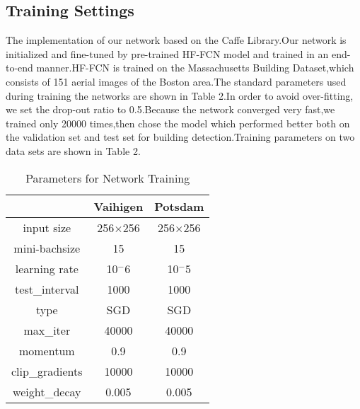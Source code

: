 \documentclass{article}
\begin{document}
\subsection{Training Settings}
The implementation of our network  based on the Caffe Library.Our network is initialized and fine-tuned by pre-trained HF-FCN model and trained in an end-to-end manner.HF-FCN is trained on the Massachusetts Building Dataset,which consists of 151 aerial images of the Boston area.The standard parameters used during training the networks are shown in Table 2.In order to avoid over-fitting, we set the drop-out ratio to 0.5.Because the network converged very fast,we trained only 20000 times,then chose the model which performed better both on the validation set and test set for building detection.Training parameters on two data sets are shown in Table 2.
\begin{table}
\centering
\caption {Parameters for Network Training}
\begin{tabular}{c|c|c}
\hline
&Vaihigen &Potsdam\\  \hline
input size & 256$\times$256 &256$\times$256 \\
mini-bachsize & 15 &15 \\
learning rate & 10$^-6$ & 10$^-5$\\
test\_interval& 1000 &1000\\
type & SGD &SGD\\
max\_iter& 40000& 40000\\
momentum&0.9 &0.9\\
clip\_gradients & 10000 &10000\\
weight\_decay&0.005 &0.005\\ \hline
\end{tabular}
\end{table}
\end{document}
